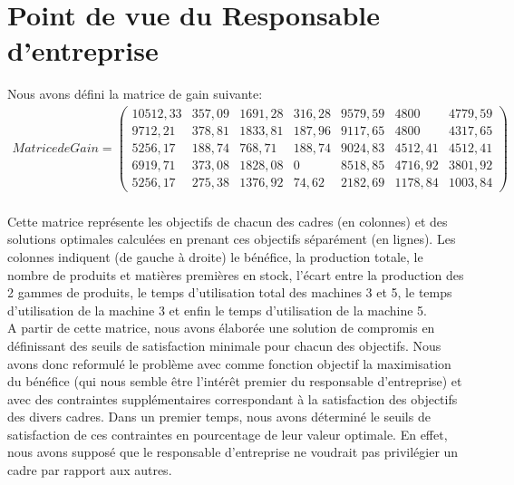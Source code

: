 \documentclass[12pt]{article}
\begin{document}
\section{Point de vue du Responsable d'entreprise}
Nous avons défini la matrice de gain suivante:
\begin{align*}
Matrice de Gain =
 \begin{pmatrix}
  10512,33	&357,09	&1691,28 &316,28& 9579,59 &4800 &4779,59\\
9712,21	&378,81	&1833,81	&187,96	&9117,65	&4800	&4317,65\\
5256,17	&188,74	&768,71	&188,74	&9024,83	&4512,41	&4512,41\\
6919,71	&373,08	&1828,08	&0	&8518,85	&4716,92	&3801,92\\
5256,17	&275,38	&1376,92 &74,62	&2182,69   &1178,84 &1003,84
 \end{pmatrix}
\end{align*}\\

Cette matrice représente les objectifs de chacun des cadres (en colonnes) et des solutions optimales calculées en prenant ces objectifs séparément (en lignes). Les colonnes indiquent (de gauche à droite) le bénéfice, la production totale, le nombre de produits et matières premières en stock, l'écart entre la production des 2 gammes de produits, le temps d'utilisation total des machines 3 et 5, le temps d'utilisation de la machine 3 et enfin le temps d'utilisation de la machine 5.\\

A partir de cette matrice, nous avons élaborée une solution de compromis en définissant des seuils de satisfaction minimale pour chacun des objectifs. Nous avons donc reformulé le problème avec comme fonction objectif la maximisation du bénéfice (qui nous semble être l'intérêt premier du responsable d'entreprise) et avec des contraintes supplémentaires correspondant à la satisfaction des objectifs des divers cadres. Dans un premier temps, nous avons déterminé le seuils de satisfaction de ces contraintes en pourcentage de leur valeur optimale. En effet, nous avons supposé que le responsable d'entreprise ne voudrait pas privilégier un cadre par rapport aux autres.
 
\end{document}
